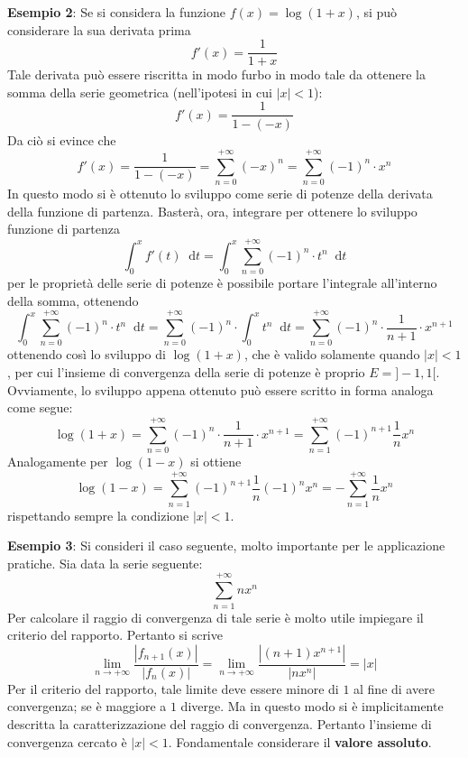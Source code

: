\documentclass[a4paper]{extarticle}
\newcommand*\dif{\mathop{}\!\mathrm{d}}
\begin{document}
\vspace{1em}
\noindent
\textbf{Esempio 2}: Se si considera la funzione $f(x)=\log(1+x)$, si può considerare la sua derivata prima
\[f'(x)=\frac{1}{1+x}\]
Tale derivata può essere riscritta in modo furbo in modo tale da ottenere la somma della serie geometrica (nell'ipotesi in cui $\vert x \vert < 1$):
\[f'(x)=\frac{1}{1-(-x)}\]
Da ciò si evince che
\[f'(x)=\frac{1}{1-(-x)}=\sum_{n=0}^{+\infty} (-x)^n=\sum_{n=0}^{+\infty} (-1)^n \cdot x^n\]
In questo modo si è ottenuto lo sviluppo come serie di potenze della derivata della funzione di partenza. Basterà, ora, integrare per ottenere lo sviluppo funzione di partenza
\[\int_0^x f'(t) \dif t = \int_0^x \sum_{n=0}^{+\infty} (-1)^n \cdot t^n \dif t\]
per le proprietà delle serie di potenze è possibile portare l'integrale all'interno della somma, ottenendo
\[\int_0^x \sum_{n=0}^{+\infty} (-1)^n \cdot t^n \dif t = \sum_{n=0}^{+\infty} (-1)^n \cdot \int_0^x t^n \dif t = \sum_{n=0}^{+\infty} (-1)^n \cdot \frac{1}{n+1} \cdot x^{n+1}\]
ottenendo così lo sviluppo di $\log(1+x)$, che è valido solamente quando $\vert x \vert < 1$, per cui l'insieme di convergenza della serie di potenze è proprio $E=]-1,1[$. Ovviamente, lo sviluppo appena ottenuto può essere scritto in forma analoga come segue:
\[\log(1+x)=\sum_{n=0}^{+\infty} (-1)^n \cdot \frac{1}{n+1} \cdot x^{n+1}=\sum_{n=1}^{+\infty} (-1)^{n+1} \frac{1}{n} x^n\]
Analogamente per $\log(1-x)$ si ottiene
\[\log(1-x) = \sum_{n=1}^{+\infty} (-1)^{n+1} \frac{1}{n} (-1)^n x^n = - \sum_{n=1}^{+\infty} \dfrac{1}{n} x^n\]
rispettando sempre la condizione $\left \vert x \right \vert < 1$.

\vspace{2em}
\noindent
\textbf{Esempio 3}: Si consideri il caso seguente, molto importante per le applicazione pratiche. Sia data la serie seguente:
\[\sum_{n=1}^{+\infty} n x^n\]
Per calcolare il raggio di convergenza di tale serie è molto utile impiegare il criterio del rapporto. Pertanto si scrive
\[\lim_{n \to +\infty} \dfrac{\left \vert f_{n+1}(x) \right \vert}{\left \vert f_n(x) \right \vert} = \lim_{n \to +\infty} \dfrac{\left \vert (n+1) x^{n+1} \right \vert}{\left \vert n x^n \right \vert} = \vert x \vert\]
Per il criterio del rapporto, tale limite deve essere minore di $1$ al fine di avere convergenza; se è maggiore a $1$ diverge. Ma in questo modo si è implicitamente descritta la caratterizzazione del raggio di convergenza. Pertanto l'insieme di convergenza cercato è $\vert x \vert <1$. Fondamentale considerare il \textbf{valore assoluto}.
\end{document}
